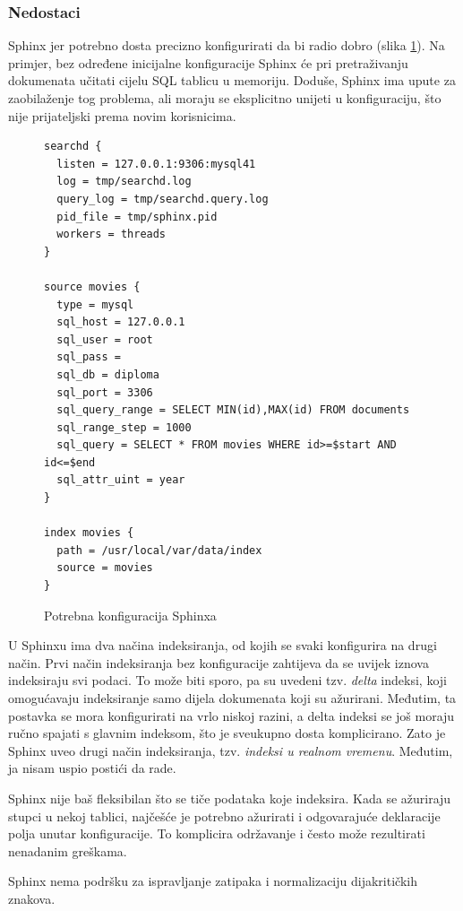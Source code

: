 \documentclass[a4paper,twoside,12pt]{scrreprt}
\begin{document}
\subsubsection{Nedostaci}

Sphinx jer potrebno dosta precizno konfigurirati da bi radio dobro (slika \ref{sphinx-configuration}). Na primjer, bez određene inicijalne konfiguracije Sphinx će pri pretraživanju dokumenata učitati cijelu SQL tablicu u memoriju. Doduše, Sphinx ima upute za zaobilaženje tog problema, ali moraju se eksplicitno unijeti u konfiguraciju, što nije prijateljski prema novim korisnicima.

\begin{figure}[H]
  \begin{Verbatim}[frame=single]
searchd {
  listen = 127.0.0.1:9306:mysql41
  log = tmp/searchd.log
  query_log = tmp/searchd.query.log
  pid_file = tmp/sphinx.pid
  workers = threads
}

source movies {
  type = mysql
  sql_host = 127.0.0.1
  sql_user = root
  sql_pass = 
  sql_db = diploma
  sql_port = 3306
  sql_query_range = SELECT MIN(id),MAX(id) FROM documents
  sql_range_step = 1000
  sql_query = SELECT * FROM movies WHERE id>=$start AND id<=$end
  sql_attr_uint = year
}

index movies {
  path = /usr/local/var/data/index
  source = movies
}
  \end{Verbatim}
  \caption{Potrebna konfiguracija Sphinxa}
  \label{sphinx-configuration}
\end{figure}

U Sphinxu ima dva načina indeksiranja, od kojih se svaki konfigurira na drugi način. Prvi način indeksiranja bez konfiguracije zahtijeva da se uvijek iznova indeksiraju svi podaci. To može biti sporo, pa su uvedeni tzv. \textit{delta} indeksi, koji omogućavaju indeksiranje samo dijela dokumenata koji su ažurirani. Međutim, ta postavka se mora konfigurirati na vrlo niskoj razini, a delta indeksi se još moraju ručno spajati s glavnim indeksom, što je sveukupno dosta komplicirano. Zato je Sphinx uveo drugi način indeksiranja, tzv. \textit{indeksi u realnom vremenu}. Međutim, ja nisam uspio postići da rade.

Sphinx nije baš fleksibilan što se tiče podataka koje indeksira. Kada se ažuriraju stupci u nekoj tablici, najčešće je potrebno ažurirati i odgovarajuće deklaracije polja unutar konfiguracije. To komplicira održavanje i često može rezultirati nenadanim greškama.

Sphinx nema podršku za ispravljanje zatipaka i normalizaciju dijakritičkih znakova.
\end{document}
